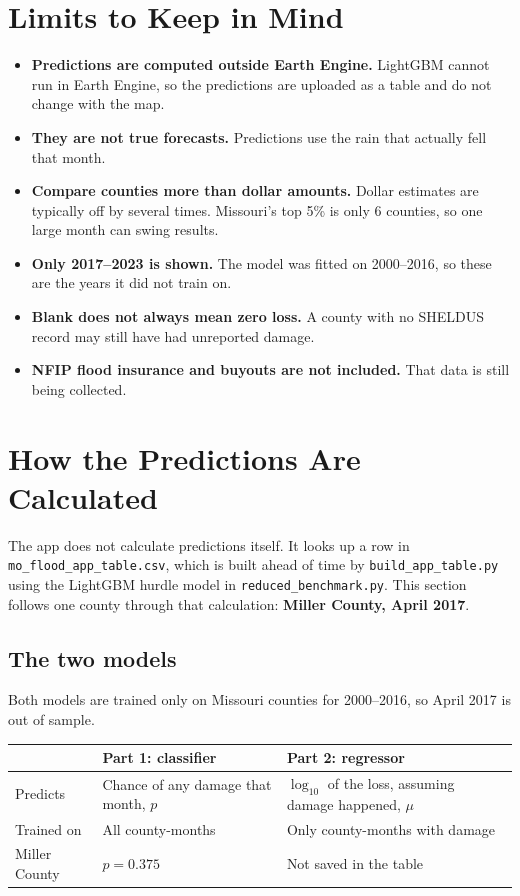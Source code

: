 \documentclass[11pt]{article}
\newcommand{\col}[1]{\texttt{#1}}
\begin{document}
\section{Limits to Keep in Mind}

\begin{itemize}
  \item \textbf{Predictions are computed outside Earth Engine.} LightGBM cannot run in Earth Engine,
        so the predictions are uploaded as a table and do not change with the map.
  \item \textbf{They are not true forecasts.} Predictions use the rain that actually fell that
        month.
  \item \textbf{Compare counties more than dollar amounts.} Dollar estimates are typically off by
        several times. Missouri's top 5\% is only 6 counties, so one large month can swing results.
  \item \textbf{Only 2017--2023 is shown.} The model was fitted on 2000--2016, so these are the
        years it did not train on.
  \item \textbf{Blank does not always mean zero loss.} A county with no SHELDUS record may still
        have had unreported damage.
  \item \textbf{NFIP flood insurance and buyouts are not included.} That data is still being collected.
\end{itemize}

\section{How the Predictions Are Calculated}

The app does not calculate predictions itself. It looks up a row in \col{mo\_flood\_app\_table.csv},
which is built ahead of time by \col{build\_app\_table.py} using the LightGBM hurdle model in
\col{reduced\_benchmark.py}. This section follows one county through that calculation:
\textbf{Miller County, April 2017}.

\subsection*{The two models}

Both models are trained only on Missouri counties for 2000--2016, so April 2017 is out of sample.

\begin{table}[H]
\centering
\small
\begin{tabularx}{\textwidth}{lYY}
\toprule
 & \textbf{Part 1: classifier} & \textbf{Part 2: regressor} \\
\midrule
Predicts & Chance of any damage that month, $p$ & $\log_{10}$ of the loss, assuming damage happened, $\mu$ \\
Trained on & All county-months & Only county-months with damage \\
Miller County & $p = 0.375$ & Not saved in the table \\
\bottomrule
\end{tabularx}
\end{table}
\end{document}
